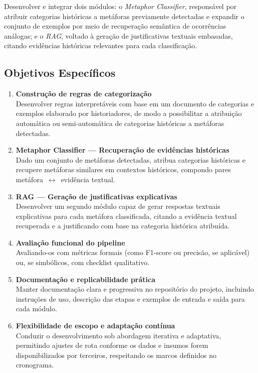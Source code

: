 Desenvolver e integrar dois módulos: o \emph{Metaphor Classifier},
responsável por atribuir categorias históricas a metáforas previamente
detectadas e expandir o conjunto de exemplos por meio de recuperação
semântica de ocorrências análogas; e o \emph{RAG}, voltado à geração de
justificativas textuais embasadas, citando evidências históricas
relevantes para cada classificação.

\subsection{\texorpdfstring{\textbf{Objetivos
Específicos}}{Objetivos Específicos}}\label{objetivos-especuxedficos}

\begin{enumerate}
\def\labelenumi{\arabic{enumi}.}
\item
  \textbf{Construção de regras de categorização}\\
  Desenvolver regras interpretáveis com base em um documento de
  categorias e exemplos elaborado por historiadores, de modo a
  possibilitar a atribuição automática ou semi-automática de categorias
  históricas a metáforas detectadas.
\item
  \textbf{Metaphor Classifier --- Recuperação de evidências
  históricas}\\
  Dado um conjunto de metáforas detectadas, atribua categorias
  históricas e recupere metáforas similares em contextos históricos,
  compondo pares metáfora~$\leftrightarrow$~evidência textual.
\item
  \textbf{RAG --- Geração de justificativas explicativas}\\
  Desenvolver um segundo módulo capaz de gerar respostas textuais
  explicativas para cada metáfora classificada, citando a evidência
  textual recuperada e a justificando com base na categoria histórica
  atribuída.
\item
  \textbf{Avaliação funcional do pipeline}\\
  Avaliando-os com métricas formais (como F1-score ou precisão, se
  aplicável) ou, se simbólicos, com checklist qualitativo.
\item
  \textbf{Documentação e replicabilidade prática}\\
  Manter documentação clara e progressiva no repositório do projeto,
  incluindo instruções de uso, descrição das etapas e exemplos de
  entrada e saída para cada módulo.
\item
  \textbf{Flexibilidade de escopo e adaptação contínua}\\
  Conduzir o desenvolvimento sob abordagem iterativa e adaptativa,
  permitindo ajustes de rota conforme os dados e insumos forem
  disponibilizados por terceiros, respeitando os marcos definidos no
  cronograma.
\end{enumerate}

